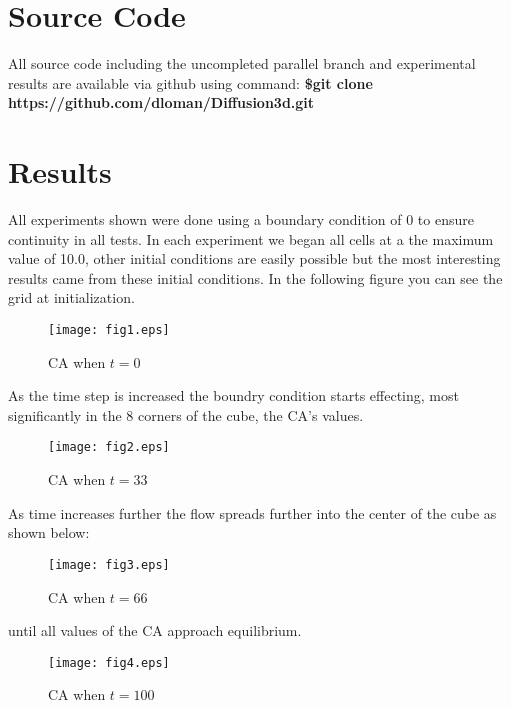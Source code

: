\documentclass[11pt,twocolumn]{article}
\begin{document}
\section{Source Code}

All source code including the uncompleted parallel branch and experimental results are available 
via github using command: \textbf{\$git clone https://github.com/dloman/Diffusion3d.git}

\section{Results}
All experiments shown were done using a boundary condition of 0 to ensure continuity in all tests. In each experiment we began all cells at a the maximum value of 10.0, other initial conditions are easily possible but the most interesting results came from these initial conditions. In the following figure you can see the grid at initialization.
\begin{figure}[ht!]
\centering
\caption{CA when $t=0$}
\texttt{[image: fig1.eps]}
\end{figure}

\vspace{7mm}

As the time step is increased the boundry condition starts effecting, most significantly in the 8 corners of the cube, the CA's values.
 

\begin{figure}[ht!]
\centering
\caption{CA when $t=33$}
\texttt{[image: fig2.eps]}
\end{figure}

\vspace{7mm}

As time increases further the flow spreads further into the center of the cube as shown below:

\vspace{5mm}

\begin{figure}[ht!]
\centering
\caption{CA when $t=66$}
\texttt{[image: fig3.eps]}
\end{figure}

\vspace{100mm}

until all values of the CA approach equilibrium.

\begin{figure}[ht!]
\centering
\caption{CA when $t=100$}
\texttt{[image: fig4.eps]}
\end{figure}
\end{document}
